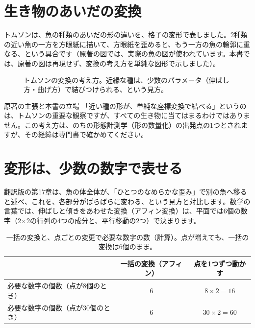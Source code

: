 \documentclass[a4paper,11pt,openany]{ltjsbook}
\begin{document}
\section{生き物のあいだの変換}

トムソンは、魚の種類のあいだの形の違いを、格子の変形で表しました。2種類の近い魚の一方を方眼紙に描いて、方眼紙を歪めると、もう一方の魚の輪郭に重なる、という具合です（原著の図では、実際の魚の図が使われています。本書では、原著の図は再現せず、変換の考え方を単純な図形で示しました）。

\begin{figure}[htbp]
\centering
{}
\caption{トムソンの変換の考え方。近縁な種は、少数のパラメータ（伸ばし方・曲げ方）で結びつけられる、という見方。}
\end{figure}

\begin{notebox}{原著の主張と本書の立場}
「近い種の形が、単純な座標変換で結べる」というのは、トムソンの重要な観察ですが、すべての生き物に当てはまるわけではありません。この考え方は、のちの形態計測学（形の数量化）の出発点の1つとされますが、その経緯は専門書で確かめてください。
\end{notebox}

\section{変形は、少数の数字で表せる}

翻訳版の第17章は、魚の体全体が、「ひとつのなめらかな歪み」で別の魚へ移ると述べ、これを、各部分がばらばらに変わる、という見方と対比します。数学の言葉では、伸ばしと傾きをあわせた変換（アフィン変換）は、平面では6個の数字（2×2の行列の4つの成分と、平行移動の2つ）で決まります。

\begin{table}[htbp]
\centering
\begin{tabular}{lcc}
\toprule
 & 一括の変換（アフィン） & 点を1つずつ動かす\\
\midrule
必要な数字の個数（点が8個のとき） & 6 & $8\times2=16$\\
必要な数字の個数（点が30個のとき） & 6 & $30\times2=60$\\
\bottomrule
\end{tabular}
\caption{一括の変換と、点ごとの変更で必要な数字の数（計算）。点が増えても、一括の変換は6個のまま。}
\end{table}
\end{document}
